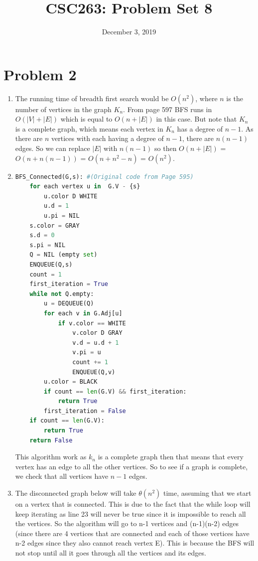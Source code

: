 \documentclass{article}
\title{CSC263: Problem Set 8}
\date{December 3, 2019}
\begin{document}
\maketitle

\section{Problem 2}

\begin{enumerate}[label=(\alph*)]

\item The running time of breadth first search would be $O(n^2)$, where $n$ is the number of vertices in the graph $K_n$. From page 597 BFS runs in $O(|V| + |E|)$ which is equal to $O(n + |E|)$ in this case. But note that $K_n$ is a complete graph, which means each vertex in $K_n$ has a degree of $n-1$. As there are $n$ vertices with each having a degree of $n-1$, there are $n(n-1)$ edges. So we can replace $|E|$ with $n(n-1)$ so then $O(n + |E|)$ = $O(n + n(n-1))$ = $O(n + n^2 - n)$ = $O(n^2)$. 

\item
\begin{lstlisting}[language=Python]
BFS_Connected(G,s): #(Original code from Page 595)
    for each vertex u in  G.V - {s}
        u.color D WHITE
        u.d = 1
        u.pi = NIL
    s.color = GRAY
    s.d = 0
    s.pi = NIL
    Q = NIL (empty set)
    ENQUEUE(Q,s)
    count = 1
    first_iteration = True
    while not Q.empty:
        u = DEQUEUE(Q)
        for each v in G.Adj[u]
            if v.color == WHITE
                v.color D GRAY
                v.d = u.d + 1
                v.pi = u
                count += 1
                ENQUEUE(Q,v)
        u.color = BLACK
        if count == len(G.V) && first_iteration:
            return True
        first_iteration = False
    if count == len(G.V):
        return True
    return False
\end{lstlisting}
This algorithm work as $k_n$ is a complete graph then that means that every vertex has an edge to all the other vertices. So to see if a graph is complete, we check that all vertices have $n-1$ edges.

\item The disconnected graph below will take $\theta(n^2)$ time, assuming that we start on a vertex that is connected. This is due to the fact that the while loop will keep iterating as line 23 will never be true since it is impossible to reach all the vertices. So the algorithm will go to n-1 vertices and (n-1)(n-2) edges (since there are 4 vertices that are connected and each of those vertices have n-2 edges since they also cannot reach vertex E). This is because the BFS will not stop until all it goes through all the vertices and its edges.



\end{enumerate}
\end{document}
